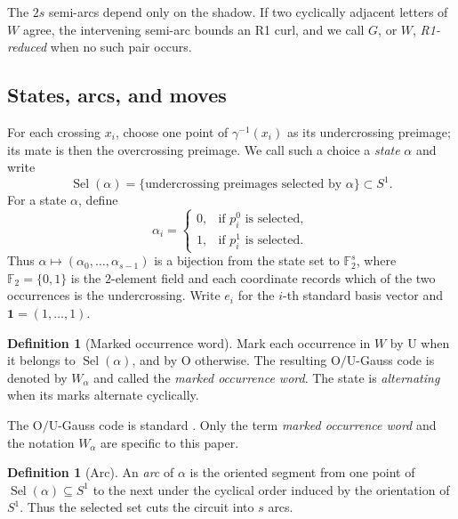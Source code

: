 \documentclass[11pt]{amsart}
\theoremstyle{definition}
\newtheorem{definition}[theorem]{Definition}
\theoremstyle{remark}
\newcommand{\F}{\mathbb F_2}
\newcommand{\one}{\mathbf 1}
\begin{document}
The \(2s\) semi-arcs depend only on the shadow.   If two cyclically
adjacent letters of \(W\) agree, the intervening semi-arc bounds an R1
curl, and we call \(G\), or \(W\), \emph{R1-reduced} when no such pair
occurs.

\subsection{States, arcs, and moves}

For each crossing \(x_i\), choose one point of
\(\gamma^{-1}(x_i)\) as its undercrossing preimage; its mate is then the
overcrossing preimage.  We call such a choice a \emph{state} \(\alpha\) and
write
\[
  \operatorname{Sel}(\alpha)
  =\{\text{undercrossing preimages selected by }\alpha\}\subset S^1.
\]
For a state \(\alpha\), define
\[
  \alpha_i=
  \begin{cases}
    0,&\text{if \(p_i^0\) is selected},\\
    1,&\text{if \(p_i^1\) is selected}.
  \end{cases}
\]
Thus \(\alpha\mapsto(\alpha_0,\ldots,\alpha_{s-1})\) is a bijection from
the state set to \(\F^s\), where \(\F=\{0,1\}\) is the \(2\)-element
field and each coordinate records which of the two occurrences is the
undercrossing.  Write \(e_i\) for the \(i\)-th standard basis vector and
\(\one=(1,\ldots,1)\).

\begin{definition}[Marked occurrence word]\label{def:marked-word}
Mark each occurrence in \(W\) by \(\mathrm U\) when it belongs to
\(\operatorname{Sel}(\alpha)\), and by \(\mathrm O\) otherwise.  The
resulting \(\mathrm O/\mathrm U\)-Gauss code is denoted by \(W_\alpha\) and called the
\emph{marked occurrence word}.  The state is \emph{alternating} when its
marks alternate cyclically.
\end{definition}

The \(\mathrm O/\mathrm U\)-Gauss code is standard
\cite[Section~3.2]{Kauffman1999}. Only the term \emph{marked occurrence word}
and the notation \(W_\alpha\) are specific to this paper.

\begin{definition}[Arc]\label{def:arc}
An \emph{arc} of \(\alpha\) is the oriented segment from one point of
\(\operatorname{Sel}(\alpha) \subseteq S^1\) to the next under the cyclical order induced by the orientation of $S^1$.  Thus the selected set cuts the
circuit into \(s\) arcs.
\end{definition}
\end{document}
